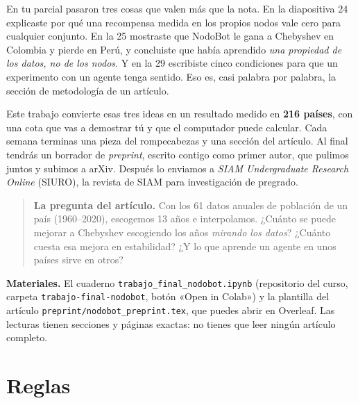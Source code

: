 En tu parcial pasaron tres cosas que valen más que la nota. En la diapositiva 24 explicaste por qué una recompensa medida en los propios nodos vale cero para cualquier conjunto. En la 25 mostraste que NodoBot le gana a Chebyshev en Colombia y pierde en Perú, y concluiste que había aprendido \emph{una propiedad de los datos, no de los nodos}. Y en la 29 escribiste cinco condiciones para que un experimento con un agente tenga sentido. Eso es, casi palabra por palabra, la sección de metodología de un artículo.

Este trabajo convierte esas tres ideas en un resultado medido en \textbf{216 países}, con una cota que vas a demostrar tú y que el computador puede calcular. Cada semana terminas una pieza del rompecabezas y una sección del artículo. Al final tendrás un borrador de \emph{preprint}, escrito contigo como primer autor, que pulimos juntos y subimos a arXiv. Después lo enviamos a \emph{SIAM Undergraduate Research Online} (SIURO), la revista de SIAM para investigación de pregrado.

\begin{quote}
\textbf{La pregunta del artículo.} Con los 61 datos anuales de población de un país (1960--2020), escogemos 13 años e interpolamos. ¿Cuánto se puede mejorar a Chebyshev escogiendo los años \emph{mirando los datos}? ¿Cuánto cuesta esa mejora en estabilidad? ¿Y lo que aprende un agente en unos países sirve en otros?
\end{quote}

\textbf{Materiales.} El cuaderno \texttt{trabajo\_final\_nodobot.ipynb} (repositorio del curso, carpeta \texttt{trabajo-final-nodobot}, botón «Open in Colab») y la plantilla del artículo \texttt{preprint/nodobot\_preprint.tex}, que puedes abrir en Overleaf. Las lecturas tienen secciones y páginas exactas: no tienes que leer ningún artículo completo.

\section{Reglas}

